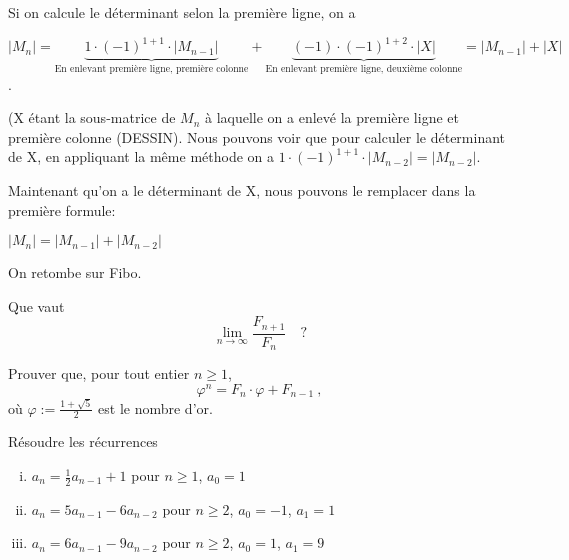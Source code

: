 Si on calcule le déterminant selon la première ligne, on a 

\[|M_n| = \underbrace{1\cdot (-1)^{1+1} \cdot |M_{n-1}|}_{\text{En enlevant première ligne, première colonne}} + \underbrace{(-1) \cdot (-1)^{1+2} \cdot |X|}_{\text{En enlevant première ligne, deuxième colonne}} = |M_{n-1}| + |X|\].

(X étant la sous-matrice de $M_n$ à laquelle on a enlevé la première ligne et première colonne (DESSIN). Nous pouvons voir que pour calculer le déterminant de X, en appliquant la même méthode on a $1 \cdot (-1)^{1+1} \cdot |M_{n-2}| = |M_{n-2}|$.

Maintenant qu'on a le déterminant de X, nous pouvons le remplacer dans la première formule:

$|M_{n}| = |M_{n-1}| + |M_{n-2}|$

On retombe sur Fibo.

\newpage


\begin{exo} 
Que vaut
\[
\lim_{n \to \infty} \frac{F_{n+1}}{F_n} \quad ?
\]
\end{exo}


\begin{exo} 
Prouver que, pour tout entier $n \geqslant 1$, 
\[
\varphi^n = F_n \cdot \varphi + F_{n-1}\ ,
\]
o\`u $\varphi := \frac{1+\sqrt{5}}{2}$ est le {\DEF nombre d'or}.
\end{exo}


\begin{exo}
R\'esoudre les r\'ecurrences 
%
\begin{enumerate}[(i)]
\item $a_n = \frac{1}{2} a_{n-1} + 1$ pour $n \geqslant 1$,\hfill
 $a_0 = 1$

\item $a_n = 5a_{n-1} - 6a_{n-2}$ pour $n \geqslant 2$,\hfill
 $a_0 = -1$, \quad $a_1 = 1$

\item $a_n = 6a_{n-1} - 9a_{n-2}$ pour $n \geqslant 2$,\hfill
 $a_0 = 1$, \quad $a_1 = 9$

\end{enumerate}
\end{exo}

